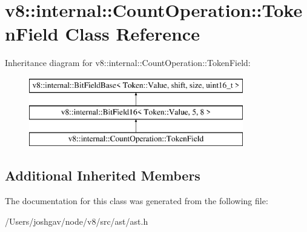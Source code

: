 \hypertarget{classv8_1_1internal_1_1_count_operation_1_1_token_field}{}\section{v8\+:\+:internal\+:\+:Count\+Operation\+:\+:Token\+Field Class Reference}
\label{classv8_1_1internal_1_1_count_operation_1_1_token_field}
Inheritance diagram for v8\+:\+:internal\+:\+:Count\+Operation\+:\+:Token\+Field\+:\begin{figure}[H]
\begin{center}
\leavevmode
\includegraphics[height=3.000000cm]{classv8_1_1internal_1_1_count_operation_1_1_token_field}
\end{center}
\end{figure}
\subsection*{Additional Inherited Members}


The documentation for this class was generated from the following file\+:\begin{DoxyCompactItemize}
\item 
/\+Users/joshgav/node/v8/src/ast/ast.\+h\end{DoxyCompactItemize}
